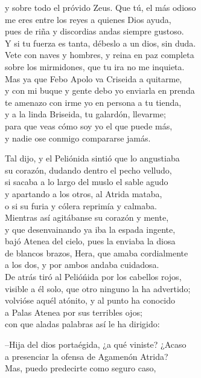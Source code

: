 \documentclass[11pt,twoside]{article}
\begin{document}
y sobre todo el próvido Zeus. Que tú, el más odioso\\
me eres entre los reyes a quienes Dios ayuda,\\
pues de riña y discordias andas siempre gustoso.\\
Y si tu fuerza es tanta, débeslo a un dios, sin duda.\\
Vete con naves y hombres, y reina en paz completa\\
sobre los mirmidones, que tu ira no me inquieta.\\
Mas ya que Febo Apolo va Criseida a quitarme,\\
y con mi buque y gente debo yo enviarla en prenda\\
te amenazo con irme yo en persona a tu tienda,\\
y a la linda Briseida, tu galardón, llevarme;\\
para que veas cómo soy yo el que puede más,\\
y nadie ose conmigo compararse jamás.\par
Tal dijo, y el Peliónida sintió que lo angustiaba\\
su corazón, dudando dentro el pecho velludo,\\
si sacaba a lo largo del muslo el sable agudo\\
y apartando a los otros, al Atrida mataba,\\
o si su furia y cólera reprimía y calmaba.\\
Mientras así agitábanse su corazón y mente,\\
y que desenvainando ya iba la espada ingente,\\
bajó Atenea del cielo, pues la enviaba la diosa\\
de blancos brazos, Hera, que amaba cordialmente\\
a los dos, y por ambos andaba cuidadosa.\\
De atrás tiró al Pelióńida por los cabellos rojos,\\
visible a él solo, que otro ninguno la ha advertido;\\
volvióse aquél atónito, y al punto ha conocido\\
a Palas Atenea por sus terribles ojos;\\
con que aladas palabras así le ha dirigido:\par
--Hija del dios portaégida, ¿a qué viniste? ¿Acaso\\
a presenciar la ofensa de Agamenón Atrida?\\
Mas, puedo predecirte como seguro caso,\\
\end{document}
